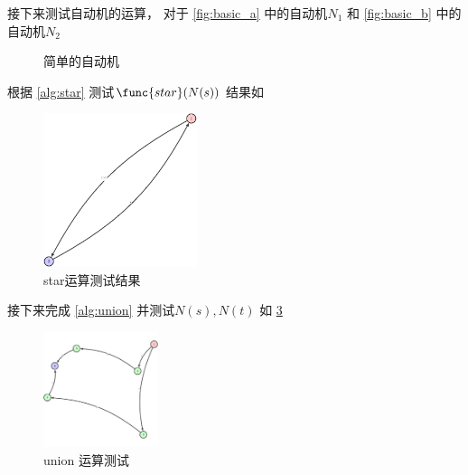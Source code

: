 \documentclass[../report]{subfiles}
\begin{document}
接下来测试自动机的运算，
对于%
\cref{fig:basic_a}%
中的自动机$N_1$
和%
\cref{fig:basic_b}%
中的自动机$N_2$
\begin{figure}[H]
  \qquad
  \caption{简单的自动机}
  \label{fig:basic}
\end{figure}

根据%
\cref{alg:star}
测试$\func{star}(N(s))$
结果如%
\begin{figure}[H]
  \centering
  \includegraphics[width = 0.4\textwidth]{test_star}
  \caption{star运算测试结果}
  \label{fig:test_star}
\end{figure}

接下来完成%
\cref{alg:union}
并测试$N(s),N(t)$
如%
\cref{fig:test_union}

\begin{figure}[H]
  \centering
  \includegraphics[width = 0.3\textwidth]{test_union}
  \caption{union 运算测试}
  \label{fig:test_union}
\end{figure}
\end{document}
